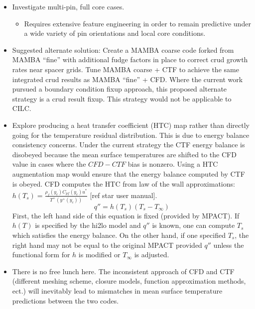 \begin{itemize}
	\item  Investigate multi-pin, full core cases.
	\begin{itemize}
		\item Requires extensive feature engineering in order to remain predictive under a wide variety of pin orientations and local core conditions.
	\end{itemize}
	\item Suggested alternate solution:  Create a MAMBA coarse code forked from MAMBA ``fine'' with additional fudge factors in place to correct crud growth rates near spacer grids.  Tune MAMBA coarse + CTF to achieve the same integrated crud results as MAMBA ``fine'' + CFD.  Where the current work pursued a boundary condition fixup approach, this proposed alternate strategy is a crud result fixup.   This strategy would not be applicable to CILC.
	\item Explore producing a heat transfer coefficient (HTC) map rather than directly going for the temperature residual distribution.  This is due to energy balance consistency concerns.  Under the current strategy the CTF energy balance is disobeyed because the mean surface temperatures are shifted to the CFD value in cases where the $CFD-CTF$ bias is nonzero.  Using a HTC augmentation map would ensure that the energy balance computed by CTF is obeyed.  CFD computes the HTC from law of the wall approximations: $h(T_s) = \frac{\rho_f(y_c) C_{pf}(y_c){u^*}}{T^{+}(y^{+}(y_c))}$ [ref star user manual].  
	\begin{equation}
	q'' = h(T_s)(T_s - T_\infty)
	\end{equation}
	First, the left hand side of this equation is fixed (provided by MPACT).  If $h(T)$ is specified by the hi2lo model and $q''$ is known, one can compute $T_s$ which satisfies the energy balance.  On the other hand, if one specified $T_s$, the right hand may not be equal to the original MPACT provided $q''$ unless the functional form for $h$ is modified or $T_\infty$ is adjusted.  
	\item There is no free lunch here.  The inconsistent approach of CFD and CTF (different meshing scheme, closure models, function approximation methods, ect.) will inevitably lead to mismatches in mean surface temperature predictions between the two codes.
	
\end{itemize}
